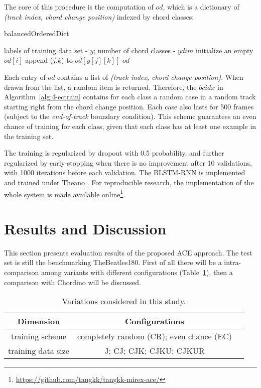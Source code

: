 The core of this procedure is the computation of $od$, which is a dictionary of \textit{(track index, chord change position)} indexed by chord classes:
\begin{algorithm}[h]
	\caption{balancedOrderedDict}
	\label{alg:4-bod}
	\begin{algorithmic}
	\REQUIRE
	labels of training data set - $y$;
	number of chord classes - $ydim$
	\STATE initialize an empty $od[i]$
	\ENDFOR
	\STATE append ($j$,$k$) to $od[y[j][k]]$
	\ENDIF
	\ENDFOR
	\ENDFOR
	\RETURN
		$od$
	\end{algorithmic}
\end{algorithm}
Each entry of $od$ contains a list of \textit{(track index, chord change position)}. When drawn from the list, a random item is returned. Therefore, the $bcidx$ in Algorithm~\ref{alg:4-ectrain} contains for each class a random case in a random track starting right from the chord change position. Each case also lasts for 500 frames (subject to the \textit{end-of-track} boundary condition). This scheme guarantees an even chance of training for each class, given that each class has at least one example in the training set.

The training is regularized by dropout with 0.5 probability, and further regularized by early-stopping when there is no improvement after 10 validations, with 1000 iterations before each validation. The BLSTM-RNN is implemented and trained under Theano \cite{bergstra2011theano}. For reproducible research, the implementation of the whole system is made available online\footnote{\url{https://github.com/tangkk/tangkk-mirex-ace/}}.

\section{Results and Discussion}\label{sec:4-eval}
This section presents evaluation results of the proposed ACE approach. The test set is still the benchmarking TheBeatles180. First of all there will be a intra-comparison among variants with different configurations (Table~\ref{tab:4-varexplore}), then a comparison with Chordino will be discussed.

\begin{table}
\caption{Variations considered in this study.}
\centering
\footnotesize
\begin{tabular}{|c|c|c|} \hline
Dimension & Configurations \\ \hline
training scheme & completely random (CR); even chance (EC) \\ \hline
training data size & J; CJ; CJK; CJKU; CJKUR \\ \hline
\end{tabular}
\label{tab:4-varexplore}
\end{table}

